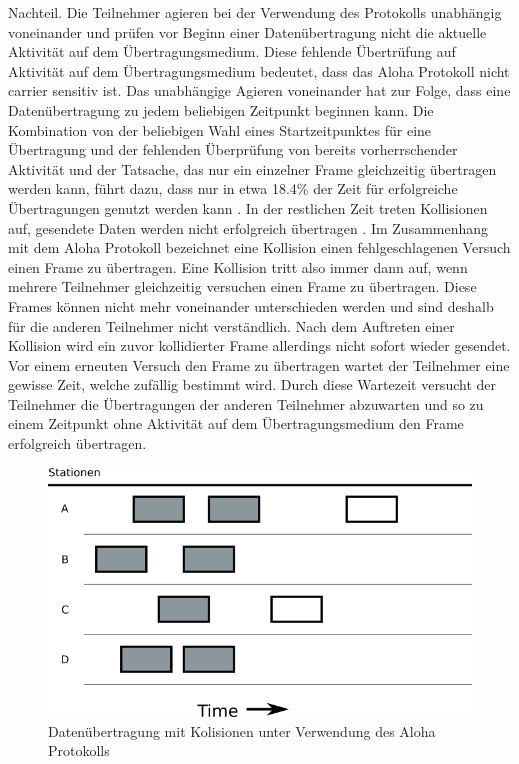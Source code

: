 Nachteil. Die Teilnehmer agieren bei der Verwendung des Protokolls unabhängig voneinander und prüfen vor Beginn einer Datenübertragung nicht die aktuelle Aktivität auf dem Übertragungsmedium. Diese fehlende Übertrüfung auf Aktivität auf dem Übertragungsmedium bedeutet, dass das Aloha Protokoll nicht carrier sensitiv ist. Das unabhängige Agieren voneinander hat zur Folge, dass eine Datenübertragung zu jedem beliebigen Zeitpunkt beginnen kann. Die Kombination von der beliebigen Wahl eines Startzeitpunktes für eine Übertragung und der fehlenden Überprüfung von bereits vorherrschender Aktivität und der Tatsache, das nur ein einzelner Frame gleichzeitig übertragen werden kann, führt dazu, dass nur in etwa 18.4\% der Zeit für erfolgreiche Übertragungen genutzt werden kann \cite{Back_AlohaPure}. In der restlichen Zeit treten Kollisionen auf, gesendete Daten werden nicht erfolgreich übertragen \cite{Back_AlohaPure}. Im Zusammenhang mit dem Aloha Protokoll bezeichnet eine Kollision einen fehlgeschlagenen Versuch einen Frame zu übertragen. Eine Kollision tritt also immer dann auf, wenn mehrere Teilnehmer gleichzeitig versuchen einen Frame zu übertragen. Diese Frames können nicht mehr voneinander unterschieden werden und sind deshalb für die anderen Teilnehmer nicht verständlich. Nach dem Auftreten einer Kollision wird ein zuvor kollidierter Frame allerdings nicht sofort wieder gesendet. Vor einem erneuten Versuch den Frame zu übertragen wartet der Teilnehmer eine gewisse Zeit, welche zufällig bestimmt wird. Durch diese Wartezeit versucht der Teilnehmer die Übertragungen der anderen Teilnehmer abzuwarten und so zu einem Zeitpunkt ohne Aktivität auf dem Übertragungsmedium den Frame erfolgreich übertragen.
\begin{figure}[h!]
	\begin{center}
	\includegraphics[scale=0.6]{img/ZeichnungExport2.png}
	\caption{Datenübertragung mit Kolisionen unter Verwendung des Aloha Protokolls}
	\end{center}
	\label{Abb2_PureAloha}
\end{figure}

